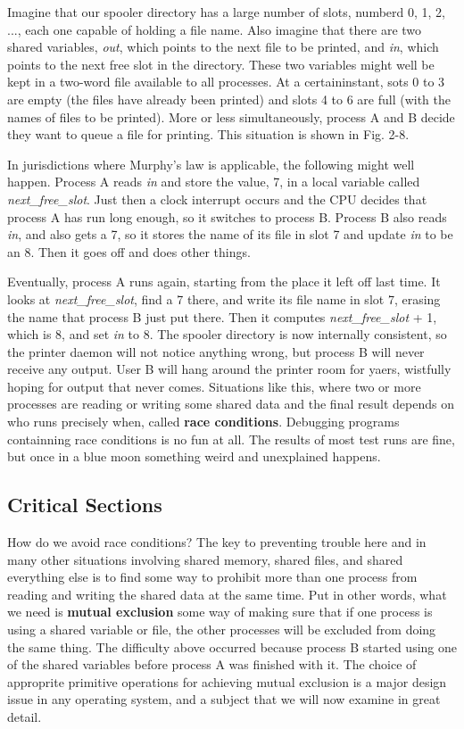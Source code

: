 \documentclass{book}
\newcommand {\kw}  [1] {\textbf{#1}}
\newcommand {\sys} [1] {\textsl{#1}}
\begin{document}
Imagine that our spooler directory has a large number of slots, numberd 0, 1, 2, ..., 
each one capable of holding a file name.
Also imagine that there are two shared variables, 
\sys{out}, which points to the next file to be printed,
and \sys{in}, which points to the next free slot in the directory.
These two variables might well be kept in a two-word file available to all processes.
At a certaininstant, sots 0 to 3 are empty (the files have already been printed) and slots 4 to 6 are full (with the names of files to be printed).
More or less simultaneously, process A and B decide they want to queue a file for printing.
This situation is shown in Fig. 2-8.

In jurisdictions where Murphy's law is applicable, the following might well happen.
Process A reads \sys{in} and store the value, 7, in a local variable called \sys{next\_free\_slot}.
Just then a clock interrupt occurs and the CPU decides that process A has run long enough, 
so it switches to process B.
Process B also reads \sys{in}, and also gets a 7, so it stores the name of its file in slot 7 and update \sys{in} to be an 8.
Then it goes off and does other things.

Eventually, process A runs again, starting from the place it left off last time.
It looks at \sys{next\_free\_slot}, find a 7 there, and write its file name in slot 7, erasing the name that process B just put there.
Then it computes \sys{next\_free\_slot} + 1, which is 8, and set \sys{in} to 8.
The spooler directory is now internally consistent, so the printer daemon will not notice anything wrong,
but process B will never receive any output.
User B will hang around the printer room for yaers, wistfully hoping for output that never comes.
Situations like this, where two or more processes are reading or writing some shared data 
and the final result depends on who runs precisely when, called \kw{race conditions}.
Debugging programs containning race conditions is no fun at all.
The results of most test runs are fine, but once in a blue moon something weird and unexplained happens.

\subsection{Critical Sections}
How do we avoid race conditions?
The key to preventing trouble here and in many other situations involving shared memory, shared files, and shared everything else 
is to find some way to prohibit more than one process from reading and writing the shared data at the same time.
Put in other words, what we need is \kw{mutual exclusion} some way of making sure that
if one process is using a shared variable or file, the other processes will be excluded from doing the same thing.
The difficulty above occurred because process B started using one of the shared variables before process A was finished with it.
The choice of approprite primitive operations for achieving mutual exclusion is a major design issue in any operating system,
and a subject that we will now examine in great detail.
\end{document}
